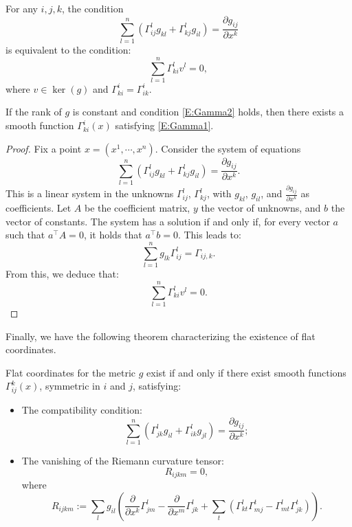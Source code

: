 \begin{theorem}\label{thm:flatmetric}
For any $ i, j, k $, the condition  
\begin{equation}\label{E:Gamma1}
\sum_{l=1}^n \left( \Gamma_{ij}^l g_{kl} + \Gamma_{kj}^l g_{il} \right) = \frac{\partial g_{ij}}{\partial x^k} 
\end{equation}
is equivalent to the condition:  
\begin{equation}\label{E:Gamma2}
\sum_{l=1}^n \Gamma_{ki}^l v^l = 0, 
\end{equation}
where $v \in \ker(g) $ and $\Gamma_{ki}^i = \Gamma_{ik}^i $.  

If the rank of $ g $ is constant and condition \eqref{E:Gamma2} holds, then there exists a smooth function $ \Gamma_{ki}^i(x) $ satisfying \eqref{E:Gamma1}.  
\end{theorem}

\begin{proof}
Fix a point $x = (x^1, \cdots, x^n)$. Consider the system of equations
\[
\sum_{l=1}^n (\Gamma_{ij}^l g_{kl} + \Gamma_{kj}^l g_{il}) = \frac{\partial g_{ij}}{\partial x^k}.
\]
This is a linear system in the unknowns $\Gamma_{ij}^l$, $\Gamma_{kj}^l$, with $g_{kl}$, $g_{il}$, and $\frac{\partial g_{ij}}{\partial x^k}$ as coefficients. Let $A$ be the coefficient matrix, $y$ the vector of unknowns, and $b$ the vector of constants. The system has a solution if and only if, for every vector $a$ such that $a^\top A = 0$, it holds that $a^\top b = 0$. This leads to:
\[
\sum_{l=1}^n g_{lk} \Gamma_{ij}^l = \Gamma_{ij, k}.
\]
From this, we deduce that:
\[
\sum_{l=1}^n \Gamma_{ki}^l v^l = 0.
\]
\end{proof}

Finally, we have the following theorem characterizing the existence of flat coordinates.

\begin{theorem}\label{thm:flatcoord}
Flat coordinates for the metric $g$ exist if and only if there exist smooth functions $\Gamma_{ij}^k(x)$, symmetric in $i$ and $j$, satisfying:
\begin{itemize}
    \item The compatibility condition:
    \[
    \sum_{l=1}^n (\Gamma_{jk}^l g_{il} + \Gamma_{ik}^l g_{jl}) = \frac{\partial g_{ij}}{\partial x^k};
    \]
    \item The vanishing of the Riemann curvature tensor:
    \[
    R_{ijkm} = 0,
    \]
    where
    \[
    R_{ijkm} := \sum_l g_{il} \left( \frac{\partial}{\partial x^k} \Gamma_{jm}^l - \frac{\partial}{\partial x^m} \Gamma_{jk}^l + 
    \sum_t (\Gamma_{kt}^l \Gamma_{mj}^t - \Gamma_{mt}^l \Gamma_{jk}^t) \right).
    \]
\end{itemize}
\end{theorem}

